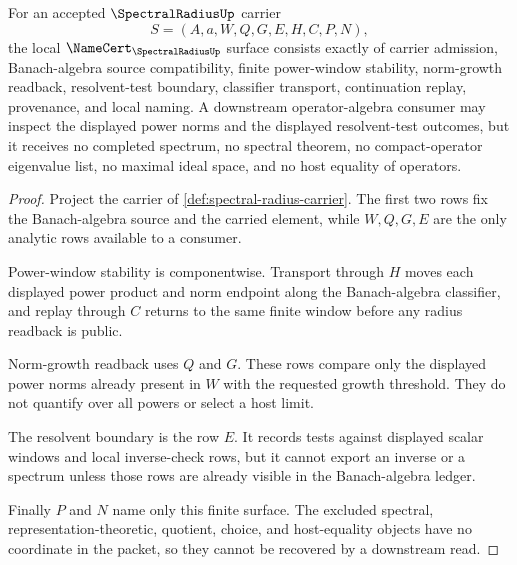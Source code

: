 \begin{theorem}
\label{thm:spectral-radius-namecert-obligations}
For an accepted $\SpectralRadiusUp$ carrier
$$
S=(A,a,W,Q,G,E,H,C,P,N),
$$
the local $\NameCert_{\SpectralRadiusUp}$ surface consists exactly of carrier admission, Banach-algebra source compatibility, finite power-window stability, norm-growth readback, resolvent-test boundary, classifier transport, continuation replay, provenance, and local naming. A downstream operator-algebra consumer may inspect the displayed power norms and the displayed resolvent-test outcomes, but it receives no completed spectrum, no spectral theorem, no compact-operator eigenvalue list, no maximal ideal space, and no host equality of operators.
\end{theorem}
\begin{proof}
Project the carrier of \autoref{def:spectral-radius-carrier}. The first two rows fix the Banach-algebra source and the carried element, while $W,Q,G,E$ are the only analytic rows available to a consumer.

Power-window stability is componentwise. Transport through $H$ moves each displayed power product and norm endpoint along the Banach-algebra classifier, and replay through $C$ returns to the same finite window before any radius readback is public.

Norm-growth readback uses $Q$ and $G$. These rows compare only the displayed power norms already present in $W$ with the requested growth threshold. They do not quantify over all powers or select a host limit.

The resolvent boundary is the row $E$. It records tests against displayed scalar windows and local inverse-check rows, but it cannot export an inverse or a spectrum unless those rows are already visible in the Banach-algebra ledger.

Finally $P$ and $N$ name only this finite surface. The excluded spectral, representation-theoretic, quotient, choice, and host-equality objects have no coordinate in the packet, so they cannot be recovered by a downstream read.
\end{proof}

